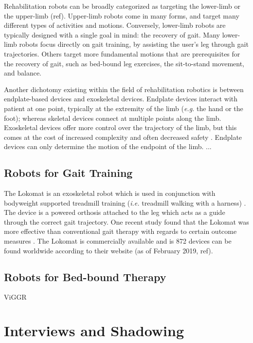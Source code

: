 \documentclass[12pt]{report}
\begin{document}
	Rehabilitation robots can be broadly categorized as targeting the lower-limb or the upper-limb (ref). Upper-limb robots come in many forms, and target many different types of activities and motions. Conversely, lower-limb robots are typically designed with a single goal in mind: the recovery of gait. Many lower-limb robots focus directly on gait training, by assisting the user's leg through gait trajectories. Others target more fundamental motions that are prerequisites for the recovery of gait, such as bed-bound leg exercises, the sit-to-stand movement, and balance. 
	
	Another dichotomy existing within the field of rehabilitation robotics is between endplate-based devices and exoskeletal devices. Endplate devices interact with patient at one point, typically at the extremity of the limb (\textit{e.g.} the hand or the foot); whereas skeletal devices connect at multiple points along the limb. Exoskeletal devices offer more control over the trajectory of the limb, but this comes at the cost of increased complexity and often decreased safety \cite{Chang2013}. Endplate devices can only determine the motion of the endpoint of the limb. ... 
	
	\subsection{Robots for Gait Training}
	
	The Lokomat is an exoskeletal robot which is used in conjunction with bodyweight supported treadmill training (\textit{i.e.} treadmill walking with a harness) \cite{Jezernik2003}. The device is a powered orthosis attached to the leg which acts as a guide through the correct gait trajectory. One recent study found that the Lokomat was more effective than conventional gait therapy with regards to certain outcome measures \cite{Nam2017}. The Lokomat is commercially available and is 872 devices can be found worldwide according to their website (as of February 2019, ref).
	
	
	\subsection{Robots for Bed-bound Therapy}
	
	ViGGR
	
	
\section{Interviews and Shadowing}
\end{document}

